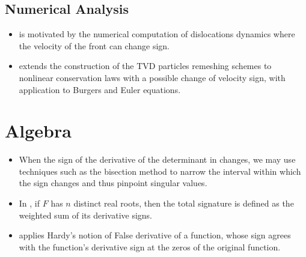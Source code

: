 \documentclass[11pt]{book}
\begin{document}
\subsection{Numerical Analysis}
\begin{itemize}
\item \cite{carlini2008convergence}
is motivated by the numerical computation of dislocations dynamics
where the velocity of the front can change sign.
\item \cite{weynans2013consistency}
extends the construction of the TVD particles remeshing schemes to
nonlinear conservation laws with a possible change of velocity sign,
with application to Burgers and Euler equations.
\end{itemize}

\section{Algebra}
\begin{itemize}
\item When the sign of the derivative of the determinant in \cite{kashiwagi2014derivative}
changes, we may use techniques such as the bisection method to narrow
the interval within which the sign changes and thus pinpoint singular
values.
\item In \cite{ghys2015signatures}, if $F$
has $n$ distinct real roots, then the total signature is defined
as the weighted sum of its derivative signs.
\item \cite{maignan2016fleshing} applies
Hardy's notion of \textquotedbl False derivative\textquotedbl{} of
a function, whose sign agrees with the function's derivative sign
at the zeros of the original function.
\end{itemize}

\end{document}
